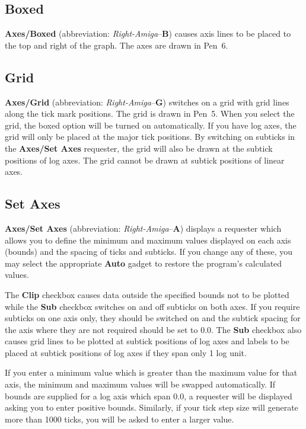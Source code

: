 \documentclass{report}
\newcommand{\RA}[1]{\mbox{{\em Right-Amiga}--{\bf #1}}}
\begin{document}
\subsection{Boxed}
{\bf Axes/Boxed} (abbreviation: \RA{B}) causes axis  
lines to be placed to the top and right of the graph. The axes are drawn in Pen~6.


\subsection{Grid}
{\bf Axes/Grid} (abbreviation: \RA{G})  switches on a grid with 
grid lines along the tick mark positions. The grid is drawn in Pen~5.
When you select the grid, the boxed option will be turned on automatically.
If you have log axes, the grid will only be placed at the major tick positions. By 
switching on subticks in the {\bf Axes/Set Axes} requester, the grid will also be 
drawn at the subtick positions of log axes. The grid cannot be drawn at subtick 
positions of linear axes.

\subsection{Set Axes}
\label{ss:bounds}
{\bf Axes/Set Axes} (abbreviation: \RA{A}) displays a requester which allows you to 
define the minimum and maximum 
values displayed on each axis (bounds) and the spacing of ticks 
 and subticks. 
If you change any of these, you may select the appropriate {\bf Auto} gadget to 
restore the program's calculated values.

The {\bf Clip} checkbox causes data outside the specified 
bounds not to be plotted 
while the {\bf Sub} checkbox switches on and off subticks on both axes. If you 
require subticks on one axis only, they should be switched on and the 
subtick spacing for the axis where they are not required should be set to 
0.0.
The {\bf Sub} checkbox also causes grid lines to be plotted at subtick positions of 
log axes and labels to be placed at subtick positions of log axes if they span only 
1 log unit.

If you enter a minimum value which is greater than the maximum value for that axis, 
the minimum and maximum values will be swapped automatically. If bounds are 
supplied for a log axis which span 0.0, a requester will be displayed asking you to 
enter positive bounds. Similarly, if your tick step size will generate more than 
1000 ticks, you will be asked to enter a larger value.
\end{document}
